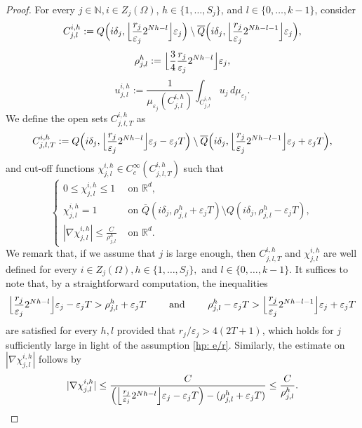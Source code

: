 \documentclass{article}
\theoremstyle{plain}
\theoremstyle{definition}
\def\rr{{\mathbb R}}
\def\NN{{\mathbb N}}
\newcommand{\ej}{\varepsilon_j}
\newcommand{\rj}{r_j}
\newcommand{\dej}{\delta_j}
\newcommand{\Q}
{\overline{Q}}
\numberwithin{equation}{section}
\begin{document}
\begin{proof}
For every $j\in\NN, i\in Z_j(\Omega)$, $h\in\{1,\dots,S_j\}$, and $l\in\{0,\dots,k-1\}$,  consider
\begin{equation*}
C^{i, h}_{j,l}:= Q\Bigl(i\delta_{j},\Bigl\lfloor\frac{\rj}{\varepsilon_{j}}2^{Nh-l}\Bigr\rfloor\varepsilon_{j}\Bigr)\setminus   \Q\Bigl(i\delta_{j},\Bigl\lfloor\frac{\rj}{\varepsilon_{j}}2^{Nh-l-1}\Bigr\rfloor\varepsilon_{j}\Bigr),
\end{equation*}
\begin{equation*}
    \rho^{ h}_{j,l}:=\Bigl\lfloor\frac{3}{4}\frac{\rj}{\varepsilon_{j}}2^{Nh-l}\Bigr\rfloor\varepsilon_{j},
\end{equation*}
\begin{equation*}
     u_{j,l}^{i, h}:=\frac{1}{\mu_{\ej}(C_{j,l}^{i,h})}\int_{C^{i, h}_{j,l}} u_{j}\, d\mu_{\ej}.
\end{equation*}
We define the open sets $C^{i, h}_{j,l,T}$ as
\begin{equation*}
C^{i, h}_{j,l,T}:=Q\Bigl(i\delta_{j},\Bigl\lfloor\frac{\rj}{\varepsilon_{j}}2^{Nh-l}\Bigr\rfloor\varepsilon_{j}-\ej T\Bigr)\setminus   \Q\Bigl(i\delta_{j},\Bigl\lfloor\frac{\rj}{\varepsilon_{j}}2^{Nh-l-1}\Bigr\rfloor\varepsilon_{j}+\ej T\Bigr),
\end{equation*}
and cut-off functions $\chi^{i,h}_{j,l}\in C^\infty_c(C^{i, h}_{j,l,T})$ such that
\begin{equation*}
    \begin{cases}
        0\leq \chi^{i,h}_{j,l} \leq 1 & \text{ on } \rr^d, \\[5pt]
        \chi^{i,h}_{j,l}= 1 & \text{ on } \Q(i\dej,\rho^{h}_{j,l}+\ej T)\setminus Q(i\dej,\rho^{h}_{j,l}-\ej T), \\[5pt]
        |\nabla\chi^{i,h}_{j,l}| \leq \frac{C}{\rho^{h}_{j,l}} & \text{ on } \rr^d.
    \end{cases}
\end{equation*}
We remark that, if we assume that $j$ is large enough, then $C^{i,h}_{j,l,T}$ and $\chi^{i,h}_{j,l}$ are well defined for every $i\in Z_j(\Omega), h\in\{1,\dots,S_j\},$ and $l\in\{0,\dots,k-1\}$. It suffices to note that, by a straightforward computation, the inequalities
\begin{equation*}
   \Bigl\lfloor \frac{\rj}{\ej}2^{Nh-l}\Bigr\rfloor\ej-\ej T>  \rho_{j,l}^{h}+\ej T \qquad \text{ and } \qquad \rho_{j,l}^{h}-\ej T>  \Bigl\lfloor \frac{\rj}{\ej}2^{Nh-l-1}\Bigr\rfloor\ej+\ej T
\end{equation*}
are satisfied for every $h,l$ provided that $\rj/\ej>4(2T+1)$, which holds for $j$ sufficiently large in light of the assumption \eqref{hp: e/r}. Similarly, the estimate on $|\nabla\chi^{i,h}_{j,l}|$ follows by 
\begin{equation*}
    |\nabla\chi^{i,h}_{j,l}|\leq \frac{C}{\Bigl(\Bigl\lfloor\frac{\rj}{\varepsilon_{j}}2^{Nh-l}\Bigr\rfloor\varepsilon_{j}-\ej T\Bigr)-(\rho^{h}_{j,l}+\ej T)} \leq \frac{C}{\rho^{h}_{j,l}}.
\end{equation*}


\end{proof}
\end{document}
